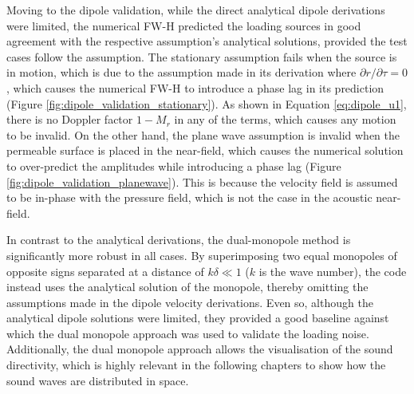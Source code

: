
Moving to the dipole validation, while the direct analytical dipole derivations were limited, the numerical FW-H predicted the loading sources in good agreement with the respective assumption's analytical solutions, provided the test cases follow the assumption. The stationary assumption fails when the source is in motion, which is due to the assumption made in its derivation where $\partial r/\partial\tau=0$, which causes the numerical FW-H to introduce a phase lag in its prediction (Figure \ref{fig:dipole_validation_stationary}). As shown in Equation \ref{eq:dipole_u1}, there is no Doppler factor $1-M_r$ in any of the terms, which causes any motion to be invalid. On the other hand, the plane wave assumption is invalid when the permeable surface is placed in the near-field, which causes the numerical solution to over-predict the amplitudes while introducing a phase lag (Figure \ref{fig:dipole_validation_planewave}). This is because the velocity field is assumed to be in-phase with the pressure field, which is not the case in the acoustic near-field.

In contrast to the analytical derivations, the dual-monopole method is significantly more robust in all cases. By superimposing two equal monopoles of opposite signs separated at a distance of $k\delta\ll1$ ($k$ is the wave number), the code instead uses the analytical solution of the monopole, thereby omitting the assumptions made in the dipole velocity derivations. Even so, although the analytical dipole solutions were limited, they provided a good baseline against which the dual monopole approach was used to validate the loading noise. Additionally, the dual monopole approach allows the visualisation of the sound directivity, which is highly relevant in the following chapters to show how the sound waves are distributed in space.

